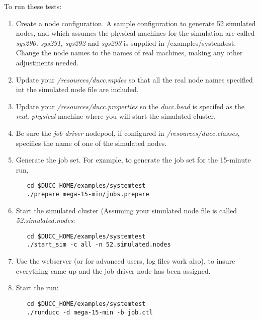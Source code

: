      To run these tests:
     \begin{enumerate}
       \item Create a node configuration.  A sample configuration to generate
         52 simulated nodes, and which assumes the
         physical machines for the simulation are called {\em sys290, sys291, sys292}
         and {\em sys293} is supplied in \duccruntime/examples/systemtest. Change
         the node names to the names of real machines, making any other adjustments
         needed.
       \item Update your {\em \duccruntime/resources/ducc.mpdes} so that all the real node names specified
         int the simulated node file are included.
       \item Update your {\em \duccruntime/resources/ducc.properties} so the 
         {\em ducc.head} is specifed as the {\em real, physical} machine where you will
         start the simulated cluster.
       \item Be sure the {\em job driver} nodepool, if configured in
         {\em \duccruntime/resources/ducc.classes}, specifies the name of one of the
         simulated nodes.
       \item Generate the job set.  For example, to generate the job set for the
         15-minute run,
\begin{verbatim}
   cd $DUCC_HOME/examples/systemtest
   ./prepare mega-15-min/jobs.prepare
\end{verbatim}
         \item Start the simulated cluster (Assuming your simulated node file is called
           {\em 52.simulated.nodes}:
\begin{verbatim}
   cd $DUCC_HOME/examples/systemtest
   ./start_sim -c all -n 52.simulated.nodes
\end{verbatim}
         \item Use the webserver (or for advanced users, log files work also), to insure
           everything came up and the job driver node has been assigned.
         \item Start the run:
\begin{verbatim}
   cd $DUCC_HOME/examples/systemtest
   ./runducc -d mega-15-min -b job.ctl
\end{verbatim}             
         \end{enumerate}
     
